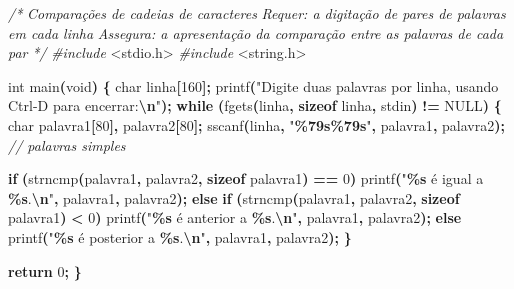 \documentclass[
  11pt,
  a4paper,
]{scrbook}
\newenvironment{Shaded}{\begin{snugshade}}{\end{snugshade}}
\newcommand{\CommentTok}[1]{\textcolor[rgb]{0.56,0.35,0.01}{\textit{#1}}}
\newcommand{\ControlFlowTok}[1]{\textcolor[rgb]{0.13,0.29,0.53}{\textbf{#1}}}
\newcommand{\DataTypeTok}[1]{\textcolor[rgb]{0.13,0.29,0.53}{#1}}
\newcommand{\DecValTok}[1]{\textcolor[rgb]{0.00,0.00,0.81}{#1}}
\newcommand{\ImportTok}[1]{#1}
\newcommand{\KeywordTok}[1]{\textcolor[rgb]{0.13,0.29,0.53}{\textbf{#1}}}
\newcommand{\NormalTok}[1]{#1}
\newcommand{\OperatorTok}[1]{\textcolor[rgb]{0.81,0.36,0.00}{\textbf{#1}}}
\newcommand{\PreprocessorTok}[1]{\textcolor[rgb]{0.56,0.35,0.01}{\textit{#1}}}
\newcommand{\SpecialCharTok}[1]{\textcolor[rgb]{0.81,0.36,0.00}{\textbf{#1}}}
\newcommand{\StringTok}[1]{\textcolor[rgb]{0.31,0.60,0.02}{#1}}
\begin{document}
\begin{Shaded}
\begin{Highlighting}[]
\CommentTok{/*}
\CommentTok{Comparações de cadeias de caracteres}
\CommentTok{Requer: a digitação de pares de palavras em cada linha}
\CommentTok{Assegura: a apresentação da comparação entre as palavras de cada par}
\CommentTok{*/}
\PreprocessorTok{\#include }\ImportTok{\textless{}stdio.h\textgreater{}}
\PreprocessorTok{\#include }\ImportTok{\textless{}string.h\textgreater{}}

\DataTypeTok{int}\NormalTok{ main}\OperatorTok{(}\DataTypeTok{void}\OperatorTok{)} \OperatorTok{\{}
    \DataTypeTok{char}\NormalTok{ linha}\OperatorTok{[}\DecValTok{160}\OperatorTok{];}
\NormalTok{    printf}\OperatorTok{(}\StringTok{"Digite duas palavras por linha, usando Ctrl{-}D para encerrar:}\SpecialCharTok{\textbackslash{}n}\StringTok{"}\OperatorTok{);}
    \ControlFlowTok{while} \OperatorTok{(}\NormalTok{fgets}\OperatorTok{(}\NormalTok{linha}\OperatorTok{,} \KeywordTok{sizeof}\NormalTok{ linha}\OperatorTok{,}\NormalTok{ stdin}\OperatorTok{)} \OperatorTok{!=}\NormalTok{ NULL}\OperatorTok{)} \OperatorTok{\{}
        \DataTypeTok{char}\NormalTok{ palavra1}\OperatorTok{[}\DecValTok{80}\OperatorTok{],}\NormalTok{ palavra2}\OperatorTok{[}\DecValTok{80}\OperatorTok{];}
\NormalTok{        sscanf}\OperatorTok{(}\NormalTok{linha}\OperatorTok{,} \StringTok{"}\SpecialCharTok{\%79s\%79s}\StringTok{"}\OperatorTok{,}\NormalTok{ palavra1}\OperatorTok{,}\NormalTok{ palavra2}\OperatorTok{);}  \CommentTok{// palavras simples}

        \ControlFlowTok{if} \OperatorTok{(}\NormalTok{strncmp}\OperatorTok{(}\NormalTok{palavra1}\OperatorTok{,}\NormalTok{ palavra2}\OperatorTok{,} \KeywordTok{sizeof}\NormalTok{ palavra1}\OperatorTok{)} \OperatorTok{==} \DecValTok{0}\OperatorTok{)}
\NormalTok{            printf}\OperatorTok{(}\StringTok{"}\SpecialCharTok{\%s}\StringTok{ é igual a }\SpecialCharTok{\%s}\StringTok{.}\SpecialCharTok{\textbackslash{}n}\StringTok{"}\OperatorTok{,}\NormalTok{ palavra1}\OperatorTok{,}\NormalTok{ palavra2}\OperatorTok{);}
        \ControlFlowTok{else} \ControlFlowTok{if} \OperatorTok{(}\NormalTok{strncmp}\OperatorTok{(}\NormalTok{palavra1}\OperatorTok{,}\NormalTok{ palavra2}\OperatorTok{,} \KeywordTok{sizeof}\NormalTok{ palavra1}\OperatorTok{)} \OperatorTok{\textless{}} \DecValTok{0}\OperatorTok{)}
\NormalTok{            printf}\OperatorTok{(}\StringTok{"}\SpecialCharTok{\%s}\StringTok{ é anterior a }\SpecialCharTok{\%s}\StringTok{.}\SpecialCharTok{\textbackslash{}n}\StringTok{"}\OperatorTok{,}\NormalTok{ palavra1}\OperatorTok{,}\NormalTok{ palavra2}\OperatorTok{);}
        \ControlFlowTok{else}
\NormalTok{            printf}\OperatorTok{(}\StringTok{"}\SpecialCharTok{\%s}\StringTok{ é posterior a }\SpecialCharTok{\%s}\StringTok{.}\SpecialCharTok{\textbackslash{}n}\StringTok{"}\OperatorTok{,}\NormalTok{ palavra1}\OperatorTok{,}\NormalTok{ palavra2}\OperatorTok{);}
    \OperatorTok{\}}

    \ControlFlowTok{return} \DecValTok{0}\OperatorTok{;}
\OperatorTok{\}}
\end{Highlighting}
\end{Shaded}
\end{document}
